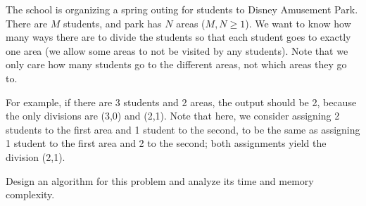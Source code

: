 \problem{}
The school is organizing a spring outing for students to Disney Amusement Park.  There are $M$ students, and park has $N$ areas ($M, N \geq 1$). We want to know how many ways there are to divide the students so that each student goes to exactly one area (we allow some areas to not be visited by any students).  Note that we only care how many students go to the different areas, not which areas they go to.  

For example, if there are 3 students and 2 areas, the output should be 2, because the only divisions are (3,0) and (2,1).  Note that here, we consider assigning 2 students to the first area and 1 student to the second, to be the same as assigning 1 student to the first area and 2 to the second; both assignments yield the division (2,1).

Design an algorithm for this problem and analyze its time and memory complexity.

\solution{

}
\newpage